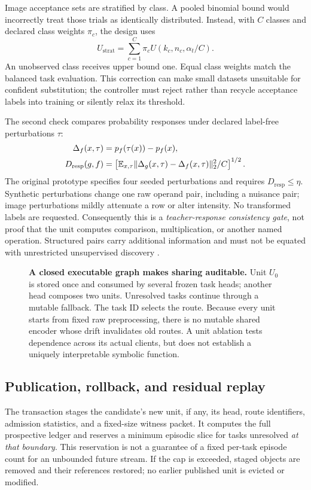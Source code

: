\documentclass{article}
\begin{document}
Image acceptance sets are stratified by class. A pooled binomial bound would incorrectly treat those trials as identically distributed. Instead, with $C$ classes and declared class weights $\pi_c$, the design uses
\begin{equation}
U_{\mathrm{strat}}=\sum_{c=1}^C\pi_c U(k_c,n_c,\alpha_t/C).
\label{eq:strat}
\end{equation}
An unobserved class receives upper bound one. Equal class weights match the balanced task evaluation. This correction can make small datasets unsuitable for confident substitution; the controller must reject rather than recycle acceptance labels into training or silently relax its threshold.

The second check compares probability responses under declared label-free perturbations $\tau$:
\begin{align}
\Delta_f(x,\tau)&=p_f(\tau(x))-p_f(x),\\
D_{\mathrm{resp}}(g,f)&=
 \left[\mathbb{E}_{x,\tau}\|\Delta_g(x,\tau)-\Delta_f(x,\tau)\|_2^2/C\right]^{1/2}.
\label{eq:response}
\end{align}
The original prototype specifies four seeded perturbations and requires $D_{\mathrm{resp}}\le\eta$. Synthetic perturbations change one raw operand pair, including a nuisance pair; image perturbations mildly attenuate a row or alter intensity. No transformed labels are requested. Consequently this is a \emph{teacher-response consistency gate}, not proof that the unit computes comparison, multiplication, or another named operation. Structured pairs carry additional information and must not be equated with unrestricted unsupervised discovery \cite{locatello2020}.

\begin{figure}[t]
\centering{}
\caption{\textbf{A closed executable graph makes sharing auditable.} Unit $U_0$ is stored once and consumed by several frozen task heads; another head composes two units. Unresolved tasks continue through a mutable fallback. The task ID selects the route. Because every unit starts from fixed raw preprocessing, there is no mutable shared encoder whose drift invalidates old routes. A unit ablation tests dependence across its actual clients, but does not establish a uniquely interpretable symbolic function.}
\label{fig:reuse}
\end{figure}

\subsection{Publication, rollback, and residual replay}
The transaction stages the candidate's new unit, if any, its head, route identifiers, admission statistics, and a fixed-size witness packet. It computes the full prospective ledger and reserves a minimum episodic slice for tasks unresolved \emph{at that boundary}. This reservation is not a guarantee of a fixed per-task episode count for an unbounded future stream. If the cap is exceeded, staged objects are removed and their references restored; no earlier published unit is evicted or modified.
\end{document}
